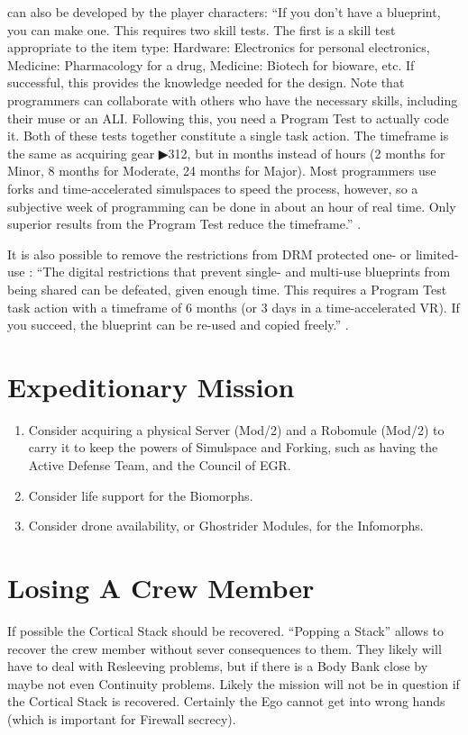\begin{enumerate}
     can also be developed by the player characters: “If you don’t have a blueprint, you can make one. This requires two skill tests. The first is a skill test appropriate to the item type: Hardware: Electronics for personal electronics, Medicine: Pharmacology for a drug, Medicine: Biotech for bioware, etc. If successful, this provides the knowledge needed for the design. Note that programmers can collaborate with others who have the necessary skills, including their muse or an ALI. Following this, you need a Program Test to actually code it. Both of these tests together constitute a single task action. The timeframe is the same as acquiring gear ▶312, but in months instead of hours (2 months for Minor, 8 months for Moderate, 24 months for Major). Most programmers use forks and time-accelerated simulspaces to speed the process, however, so a subjective week of programming can be done in about an hour of real time. Only superior results from the Program Test reduce the timeframe.” \citep[pg. 314]{ep2e_1.1_2019}.

    It is also possible to remove the restrictions from DRM protected one- or limited-use : “The digital restrictions that prevent single- and multi-use blueprints from being shared can be defeated, given enough time. This requires a Program Test task action with a timeframe of 6 months (or 3 days in a time-accelerated VR). If you succeed, the blueprint can be re-used and copied freely.” \citep[pg. 314]{ep2e_1.1_2019}.
\end{enumerate}


\section{Expeditionary Mission}

\begin{enumerate}
    \item Consider acquiring a physical \gls{Server} (Mod/2) \citep[pg. 337]{ep2e_1.1_2019} and a \gls{Robomule} (Mod/2) \citep[pg. 349]{ep2e_1.1_2019} to carry it to keep the powers of \gls{Simulspace} and \gls{Forking}, such as having the \gls{Active Defense} Team, and the Council of EGR.
    \item Consider life support for the Biomorphs.
    \item Consider drone availability, or \glspl{Ghostrider Module}, for the Infomorphs.
\end{enumerate}


\section{Losing A Crew Member}

If possible the \gls{Cortical Stack} should be recovered. “Popping a Stack” \citep[pg. 286]{ep2e_1.1_2019} allows to recover the crew member without sever consequences to them. They likely will have to deal with \gls{Resleeving} problems, but if there is a Body Bank close by maybe not even Continuity problems. Likely the mission will not be in question if the \gls{Cortical Stack} is recovered. Certainly the Ego cannot get into wrong hands (which is important for Firewall secrecy).
